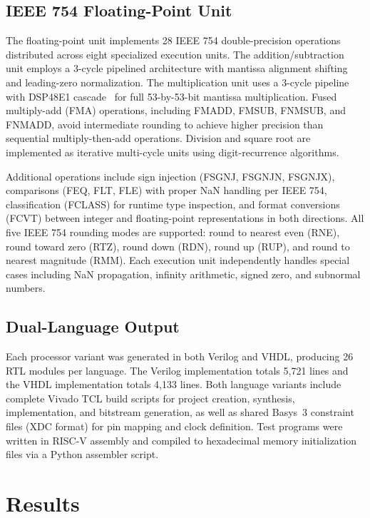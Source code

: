 \documentclass[journal]{IEEEtran}
\begin{document}
\subsection{IEEE 754 Floating-Point Unit}

The floating-point unit implements 28 IEEE 754 double-precision operations~\cite{ieee754_2019} distributed across eight specialized execution units. The addition/subtraction unit employs a 3-cycle pipelined architecture with mantissa alignment shifting and leading-zero normalization. The multiplication unit uses a 3-cycle pipeline with DSP48E1 cascade~\cite{xilinx2020ds180} for full 53-by-53-bit mantissa multiplication. Fused multiply-add (FMA) operations, including FMADD, FMSUB, FNMSUB, and FNMADD, avoid intermediate rounding to achieve higher precision than sequential multiply-then-add operations. Division and square root are implemented as iterative multi-cycle units using digit-recurrence algorithms.

Additional operations include sign injection (FSGNJ, FSGNJN, FSGNJX), comparisons (FEQ, FLT, FLE) with proper NaN handling per IEEE 754, classification (FCLASS) for runtime type inspection, and format conversions (FCVT) between integer and floating-point representations in both directions. All five IEEE 754 rounding modes are supported: round to nearest even (RNE), round toward zero (RTZ), round down (RDN), round up (RUP), and round to nearest magnitude (RMM). Each execution unit independently handles special cases including NaN propagation, infinity arithmetic, signed zero, and subnormal numbers.

\subsection{Dual-Language Output}

Each processor variant was generated in both Verilog and VHDL, producing 26 RTL modules per language. The Verilog implementation totals 5,721 lines and the VHDL implementation totals 4,133 lines. Both language variants include complete Vivado TCL build scripts for project creation, synthesis, implementation, and bitstream generation, as well as shared Basys~3 constraint files (XDC format) for pin mapping and clock definition. Test programs were written in RISC-V assembly and compiled to hexadecimal memory initialization files via a Python assembler script.

\section{Results}
\end{document}
